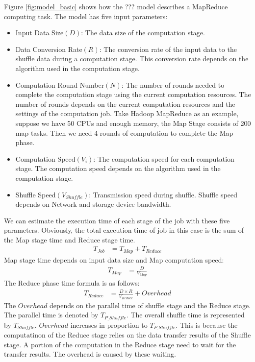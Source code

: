{Figure \ref{fig:model_basic} shows how the ??? model describes a MapReduce computing task. The model has five input parameters:
\begin{itemize}
	\item Input Data Size\((D)\): The data size of the computation stage.
	\item Data Conversion Rate\((R)\): The conversion rate of the input data to the shuffle data during a computation stage. This conversion rate depends on the algorithm used in the computation stage.
    \item Computation Round Number\((N)\): The number of rounds needed to complete the computation stage using the current computation resources. The number of rounds depends on the current computation resources and the settings of the computation job. Take Hadoop MapReduce as an example, suppose we have 50 CPUs and enough memory, the Map Stage consists of 200 map tasks. Then we need 4 rounds of computation to complete the Map phase.
    \item Computation Speed\((V_{i})\): 
    The computation speed for each computation stage. The computation speed depends on the algorithm used in the computation stage.
    \item Shuffle Speed\((V_{Shuffle})\): 
    Transmission speed during shuffle. Shuffle speed depends on Network and storage device bandwidth.
\end{itemize}

We can estimate the execution time of each stage of the job with these five parameters. Obviously, the total execution time of job in this case is the sum of the Map stage time and Reduce stage time.
\begin{equation}
\label{equation_Tjob}
\begin{aligned}
    T_{Job} &= T_{Map} + T_{Reduce}
\end{aligned}
\end{equation}
Map stage time depends on input data size and Map computation speed:
\begin{equation}
\label{equation_Tmap}
\begin{aligned}
    T_{Map} &= {{\frac{D}{V_{Map}}}}
\end{aligned}
\end{equation}
The Reduce phase time formula is as follows:
\begin{equation}
\label{equation_Treduce}
\begin{aligned}
    T_{Reduce} &= {{\frac{D \times R}{V_{Reduce}} + Overhead}}
\end{aligned}
\end{equation}
The \(Overhead\) depends on the parallel time of shuffle stage and the Reduce stage. The parallel time is denoted by \(T_{P\_Shuffle}\). The overall shuffle time is represented by \(T_{Shuffle}\). \(Overhead\) increases in proportion to \(T_{P\_Shuffle}\). This is because the computatinon of the Reduce stage relies on the data transfer results of the Shuffle stage. A portion of the computation in the Reduce stage need to wait for the transfer results. The overhead is caused by these waiting.

}
